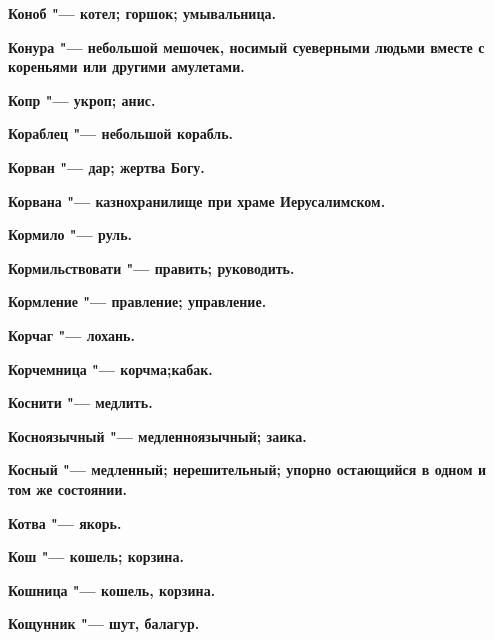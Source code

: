 \bfseries Коноб \normalfont{} "--- котел; горшок; умывальница. 




\bfseries Конура \normalfont{} "--- небольшой мешочек, носимый суеверными людьми вместе с кореньями или другими амулетами. 




\bfseries Копр \normalfont{} "--- укроп; анис. 




\bfseries Кораблец \normalfont{} "--- небольшой корабль. 




\bfseries Корван \normalfont{} "--- дар; жертва Богу. 




\bfseries Корвана \normalfont{} "--- казнохранилище при храме Иерусалимском. 




\bfseries Кормило \normalfont{} "--- руль. 




\bfseries Кормильствовати \normalfont{} "--- править; руководить. 




\bfseries Кормление \normalfont{} "--- правление; управление. 




\bfseries Корчаг \normalfont{} "--- лохань. 




\bfseries Корчемница \normalfont{} "--- корчма;кабак. 




\bfseries Коснити \normalfont{} "--- медлить. 




\bfseries Косноязычный \normalfont{} "--- медленноязычный; заика. 




\bfseries Косный \normalfont{} "--- медленный; нерешительный; упорно остающийся в одном и том же состоянии. 




\bfseries Котва \normalfont{} "--- якорь. 




\bfseries Кош \normalfont{} "--- кошель; корзина. 




\bfseries Кошница \normalfont{} "--- кошель, корзина. 




\bfseries Кощунник \normalfont{} "--- шут, балагур. 




